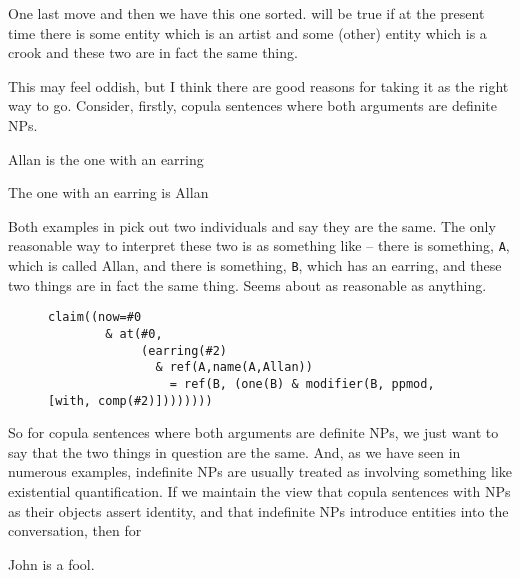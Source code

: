 \documentclass[11pt,a4paper]{article}
\begin{document}
\noindent
One last move and then we have this one sorted.  will be true if at the present time there is some entity which is an artist and
some (other) entity which is a crook and these two are in fact the
same thing. 

This may feel oddish, but I think there are good reasons for taking it
as the right way to go. Consider, firstly, copula sentences where both
arguments are definite NPs.

\begin{examples}
\item \label{S:COP1}
\begin{examples}
\item
Allan is the one with an earring
\item
The one with an earring is Allan
\end{examples}
\end{examples}

\noindent
Both examples in  pick out two individuals and say they
are the same. The only reasonable way to interpret these two is as
something like 
 -- there is something, \texttt{A}, which is called Allan,
and there is something, \texttt{B}, which has an earring, and these
two things are in fact the same thing. Seems about as reasonable as
anything.

\begin{figure}[ht!]
\begin{Verbatim}[commandchars=\\\{\}]
claim((now=#0
        & at(#0,
             (earring(#2)
               & ref(A,name(A,Allan))
                 = ref(B, (one(B) & modifier(B, ppmod, [with, comp(#2)])))))))
\end{Verbatim}
\caption{}\label{NF:Allan is the one with an earring .}
\end{figure}

\newpage
So for copula sentences where both arguments are definite NPs, we just
want to say that the two things in question are the same. And, as we
have seen in numerous examples, indefinite NPs are usually treated as
involving something like existential quantification. If we maintain
the view that copula sentences with NPs as their objects assert
identity, and that indefinite NPs introduce entities into the
conversation, then for

\begin{examples}
\item
John is a fool.
\end{examples}
\end{document}
